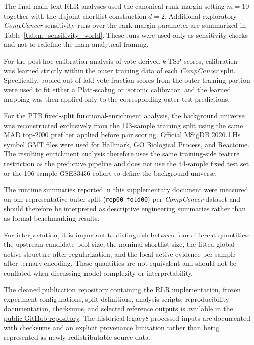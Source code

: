 \documentclass[11pt, a4paper]{article}
\begin{document}
The final main-text RLR analyses used the canonical rank-margin setting $m=10$ together with the disjoint shortlist construction $d=2$. Additional exploratory \emph{CompCancer} sensitivity runs over the rank-margin parameter are summarized in Table~\ref{tab:m_sensitivity_world}. These runs were used only as sensitivity checks and not to redefine the main analytical framing.

For the post-hoc calibration analysis of vote-derived $k$-TSP scores, calibration was learned strictly within the outer training data of each \emph{CompCancer} split. Specifically, pooled out-of-fold vote-fraction scores from the outer training portion were used to fit either a Platt-scaling or isotonic calibrator, and the learned mapping was then applied only to the corresponding outer test predictions.

For the PTB fixed-split functional-enrichment analysis, the background universe was reconstructed exclusively from the 103-sample training split using the same MAD top-2000 prefilter applied before pair scoring. Official MSigDB 2026.1.Hs symbol GMT files were used for Hallmark, GO Biological Process, and Reactome. The resulting enrichment analysis therefore uses the same training-side feature restriction as the predictive pipeline and does not use the 44-sample fixed test set or the 106-sample GSE83456 cohort to define the background universe.

The runtime summaries reported in this supplementary document were measured on one representative outer split (\texttt{rep00\_fold00}) per \emph{CompCancer} dataset and should therefore be interpreted as descriptive engineering summaries rather than as formal benchmarking results.

For interpretation, it is important to distinguish between four different quantities: the upstream candidate-pool size, the nominal shortlist size, the fitted global active structure after regularization, and the local active evidence per sample after ternary encoding. These quantities are not equivalent and should not be conflated when discussing model complexity or interpretability.

The cleaned publication repository containing the RLR implementation, frozen experiment configurations, split definitions, analysis scripts, reproducibility documentation, checksums, and selected reference outputs is available in the \href{https://github.com/mczajkowskipb/relative-logistic-regression}{public GitHub repository}. The historical legacy8 processed inputs are documented with checksums and an explicit provenance limitation rather than being represented as newly redistributable source data.
\end{document}
